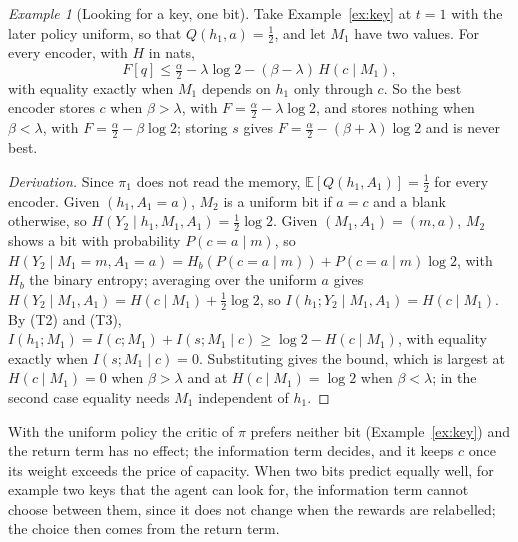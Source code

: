 \documentclass{article}
\theoremstyle{definition}
\theoremstyle{remark}
\newtheorem{example}[proposition]{Example}
\newcommand{\E}{\mathbb{E}}
\begin{document}
\begin{example}[Looking for a key, one bit]\label{ex:key7}
Take Example~\ref{ex:key} at $t=1$ with the later policy uniform, so that $Q(h_1,a)=\tfrac12$, and let $M_1$ have two values. For every encoder, with $H$ in nats,
\[
F[q]\le\tfrac\alpha2-\lambda\log2-(\beta-\lambda)\,H(c\mid M_1),
\]
with equality exactly when $M_1$ depends on $h_1$ only through $c$. So the best encoder stores $c$ when $\beta>\lambda$, with $F=\tfrac\alpha2-\lambda\log2$, and stores nothing when $\beta<\lambda$, with $F=\tfrac\alpha2-\beta\log2$; storing $s$ gives $F=\tfrac\alpha2-(\beta+\lambda)\log2$ and is never best.
\end{example}

\begin{proof}[Derivation]
Since $\pi_1$ does not read the memory, $\E[Q(h_1,A_1)]=\tfrac12$ for every encoder. Given $(h_1,A_1=a)$, $M_2$ is a uniform bit if $a=c$ and a blank otherwise, so $H(Y_2\mid h_1,M_1,A_1)=\tfrac12\log2$. Given $(M_1,A_1)=(m,a)$, $M_2$ shows a bit with probability $P(c=a\mid m)$, so $H(Y_2\mid M_1=m,A_1=a)=H_b(P(c=a\mid m))+P(c=a\mid m)\log2$, with $H_b$ the binary entropy; averaging over the uniform $a$ gives $H(Y_2\mid M_1,A_1)=H(c\mid M_1)+\tfrac12\log2$, so $I(h_1;Y_2\mid M_1,A_1)=H(c\mid M_1)$. By (T2) and (T3), $I(h_1;M_1)=I(c;M_1)+I(s;M_1\mid c)\ge\log2-H(c\mid M_1)$, with equality exactly when $I(s;M_1\mid c)=0$. Substituting gives the bound, which is largest at $H(c\mid M_1)=0$ when $\beta>\lambda$ and at $H(c\mid M_1)=\log2$ when $\beta<\lambda$; in the second case equality needs $M_1$ independent of $h_1$.
\end{proof}

With the uniform policy the critic of $\pi$ prefers neither bit (Example~\ref{ex:key}) and the return term has no effect; the information term decides, and it keeps $c$ once its weight exceeds the price of capacity. When two bits predict equally well, for example two keys that the agent can look for, the information term cannot choose between them, since it does not change when the rewards are relabelled; the choice then comes from the return term.
\end{document}
